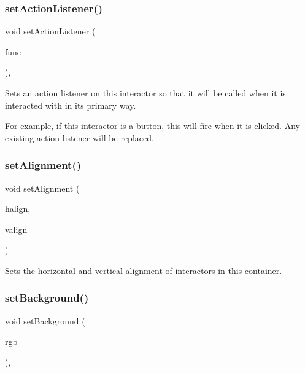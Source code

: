 \subsubsection{\texorpdfstring{set\+Action\+Listener()}{setActionListener()}\hspace{0.1cm}{\footnotesize\ttfamily [2/2]}}
{\footnotesize\ttfamily void set\+Action\+Listener (\begin{DoxyParamCaption}\item[{G\+Event\+Listener\+Void}]{func }\end{DoxyParamCaption})\hspace{0.3cm}{\ttfamily [virtual]}, {\ttfamily [inherited]}}



Sets an action listener on this interactor so that it will be called when it is interacted with in its primary way. 

For example, if this interactor is a button, this will fire when it is clicked. Any existing action listener will be replaced. \mbox{\label{classGContainer_a0bcf8805d87afc9bb4c6ca238ca7c0bd}} 
\subsubsection{\texorpdfstring{set\+Alignment()}{setAlignment()}}
{\footnotesize\ttfamily void set\+Alignment (\begin{DoxyParamCaption}\item[{Horizontal\+Alignment}]{halign,  }\item[{Vertical\+Alignment}]{valign }\end{DoxyParamCaption})\hspace{0.3cm}{\ttfamily [virtual]}}



Sets the horizontal and vertical alignment of interactors in this container. 

\mbox{\label{classGInteractor_acba7e546c2025c0a15ca4b4cc92043db}} 
\subsubsection{\texorpdfstring{set\+Background()}{setBackground()}\hspace{0.1cm}{\footnotesize\ttfamily [1/2]}}
{\footnotesize\ttfamily void set\+Background (\begin{DoxyParamCaption}\item[{int}]{rgb }\end{DoxyParamCaption})\hspace{0.3cm}{\ttfamily [virtual]}, {\ttfamily [inherited]}}



